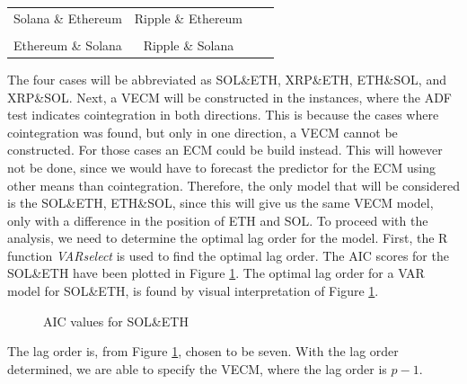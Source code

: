 \pause
\begin{center}
\begin{tabular}{cccc}
   Solana \& Ethereum \quad & \quad Ripple \& Ethereum\\\\
   Ethereum \& Solana \quad & \quad Ripple \& Solana
\end{tabular}
\end{center}
\pause
\noindent The four cases will be abbreviated as SOL\&ETH, XRP\&ETH, ETH\&SOL, and XRP\&SOL. Next, a VECM will be constructed in the instances, where the ADF test indicates cointegration in both directions. This is because the cases where cointegration was found, but only in one direction, a VECM cannot be constructed. For those cases an ECM could be build instead. This will however not be done, since we would have to forecast the predictor for the ECM using other means than cointegration. Therefore, the only model that will be considered is the SOL\&ETH, ETH\&SOL, since this will give us the same VECM model, only with a difference in the position of ETH and SOL. To proceed with the analysis, we need to determine the optimal lag order for the model. First, the R function \textit{VARselect} is used to find the optimal lag order. The AIC scores for the SOL\&ETH have been plotted in Figure \ref{fig:AIC_plots}. The optimal lag order for a VAR model for SOL\&ETH, is found by visual interpretation of Figure \ref{fig:AIC_plots}.
\begin{figure}[H]
  \centering
  \quad
  
  \caption{AIC values for SOL\&ETH}
  \label{fig:AIC_plots}
\end{figure}
\noindent The lag order is, from Figure \ref{fig:AIC_plots}, chosen to be seven. With the lag order determined, we are able to specify the VECM, where the lag order is $p-1$.

